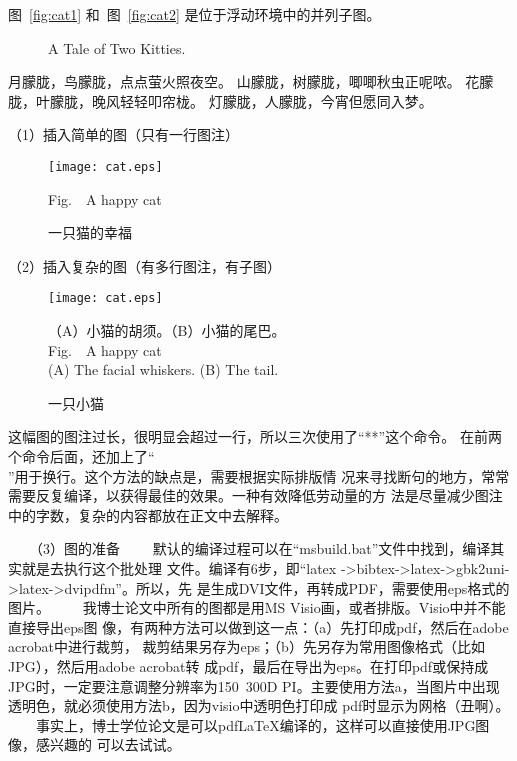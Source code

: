 图~\ref{fig:cat1} 和~图~\ref{fig:cat2} 是位于浮动环境中的并列子图。
\begin{figure}[!htbp]%
\centering
{}%
\qquad
{}%
\caption{A Tale of Two Kitties.}%
\end{figure}

月朦胧，鸟朦胧，点点萤火照夜空。 山朦胧，树朦胧，唧唧秋虫正呢哝。
花朦胧，叶朦胧，晚风轻轻叩帘栊。 灯朦胧，人朦胧，今宵但愿同入梦。

（1）插入简单的图（只有一行图注）
\begin{figure}[!htbp]
\centering
\texttt{[image: cat.eps]}
\caption{一只猫的幸福}
{\dawu Fig.\thefigure~~A happy cat}
\label{fig:cat43}
\end{figure}


（2）插入复杂的图（有多行图注，有子图）
\begin{figure}[!htbp]
\centering
\texttt{[image: cat.eps]}
\caption{一只小猫}
\small （A）小猫的胡须。（B）小猫的尾巴。\\
Fig.\thefigure~~A happy cat\\
(A) The facial whiskers. (B) The tail.
\label{fig:cat05}
\end{figure}

这幅图的图注过长，很明显会超过一行，所以三次使用了“{\dawu ***}”这个命令。
在前两个命令后面，还加上了“\\”用于换行。这个方法的缺点是，需要根据实际排版情
况来寻找断句的地方，常常需要反复编译，以获得最佳的效果。一种有效降低劳动量的方
法是尽量减少图注中的字数，复杂的内容都放在正文中去解释。

　　（3）图的准备
　　默认的编译过程可以在“msbuild.bat”文件中找到，编译其实就是去执行这个批处理
文件。编译有6步，即“latex ->bibtex->latex->gbk2uni->latex->dvipdfm”。所以，先
是生成DVI文件，再转成PDF，需要使用eps格式的图片。
　　我博士论文中所有的图都是用MS Visio画，或者排版。Visio中并不能直接导出eps图
像，有两种方法可以做到这一点：（a）先打印成pdf，然后在adobe acrobat中进行裁剪，
裁剪结果另存为eps；（b）先另存为常用图像格式（比如JPG），然后用adobe acrobat转
成pdf，最后在导出为eps。在打印pdf或保持成JPG时，一定要注意调整分辨率为150~300D
PI。主要使用方法a，当图片中出现透明色，就必须使用方法b，因为visio中透明色打印成
pdf时显示为网格（丑啊）。
　　事实上，博士学位论文是可以pdfLaTeX编译的，这样可以直接使用JPG图像，感兴趣的
可以去试试。

\newpage
